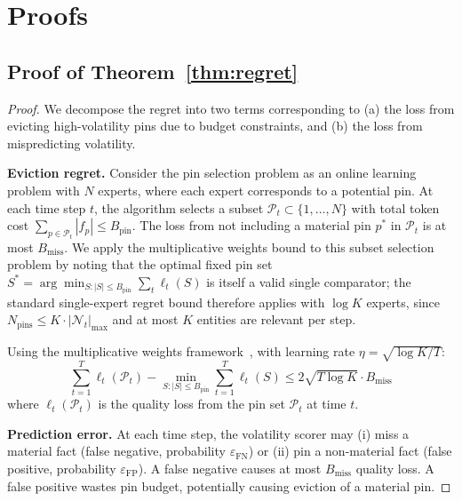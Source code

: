 \documentclass{article}
\newcommand{\nt}{\mathcal{N}_t}
\newcommand{\pt}{\mathcal{P}_t}
\begin{document}



\appendix
\section{Proofs}
\label{app:proofs}

\subsection{Proof of Theorem~\ref{thm:regret}}

\begin{proof}
We decompose the regret into two terms corresponding to (a) the loss from evicting high-volatility pins due to budget constraints, and (b) the loss from mispredicting volatility.

\textbf{Eviction regret.}
Consider the pin selection problem as an online learning problem with $N$ experts, where each expert corresponds to a potential pin.
At each time step $t$, the algorithm selects a subset $\pt \subset \{1, \ldots, N\}$ with total token cost $\sum_{p \in \pt} |f_p| \leq B_{\text{pin}}$.
The loss from not including a material pin $p^*$ in $\pt$ is at most $B_{\text{miss}}$.
We apply the multiplicative weights bound to this subset selection problem by noting that the optimal fixed pin set $S^* = \arg\min_{S:|S| \leq B_{\text{pin}}} \sum_t \ell_t(S)$ is itself a valid single comparator; the standard single-expert regret bound therefore applies with $\log K$ experts, since $N_{\text{pins}} \leq K \cdot |\nt|_{\max}$ and at most $K$ entities are relevant per step.

Using the multiplicative weights framework~\citep{cesa2006prediction}, with learning rate $\eta = \sqrt{\log K / T}$:
\begin{equation}
  \sum_{t=1}^T \ell_t(\pt) - \min_{S:|S| \leq B_{\text{pin}}} \sum_{t=1}^T \ell_t(S) \leq 2\sqrt{T \log K} \cdot B_{\text{miss}}
\end{equation}
where $\ell_t(\pt)$ is the quality loss from the pin set $\pt$ at time $t$.

\textbf{Prediction error.}
At each time step, the volatility scorer may (i) miss a material fact (false negative, probability $\varepsilon_{\text{FN}}$) or (ii) pin a non-material fact (false positive, probability $\varepsilon_{\text{FP}}$).
A false negative causes at most $B_{\text{miss}}$ quality loss.
A false positive wastes pin budget, potentially causing eviction of a material pin.


\end{proof}
\end{document}

